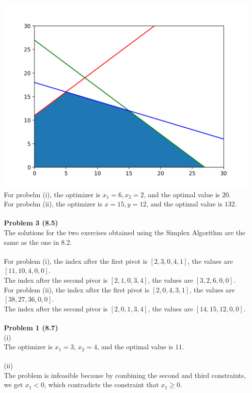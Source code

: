 \documentclass[letterpaper,12pt]{article}
\theoremstyle{definition}
\begin{document}
\includegraphics[scale=0.4]{problem_2b}\\
For probelm (i), the optimizer is $ x_1= 6, x_2 =2$, and the optimal value is $20$.\\
For probelm (ii), the optimizer is $ x= 15, y =12$, and the optimal value is $132$.\\
\\
\noindent\textbf{Problem 3 (8.5)} \\
The solutions for the two exercises obtained using the Simplex Algorithm are the same as the one in 8.2.\\
\\
For problem (i), the index after the first pivot is $[2, 3, 0, 4, 1]$, the values are $[11, 10, 4, 0, 0]$.\\
The index after the second pivor is $[2, 1, 0, 3, 4]$, the values are $[3, 2, 6, 0, 0]$.\\
For problem (ii), the index after the first pivot is $[2, 0, 4, 3, 1]$, the values are $[38, 27, 36, 0, 0]$.\\
The index after the second pivor is $[2, 0, 1, 3, 4]$, the values are $[14, 15, 12, 0, 0]$.\\
\\
\noindent\textbf{Problem 1 (8.7)} \\
(i)\\
The optimizer is $x_1 = 3$, $x_2=4$, and the optimal value is $11$.\\
\\
(ii)\\
The problem is infeasible because by combining the second and third constraints, we get $x_1<0$, which contradicts the constraint that $x_1\geq 0$.\\
\end{document}
